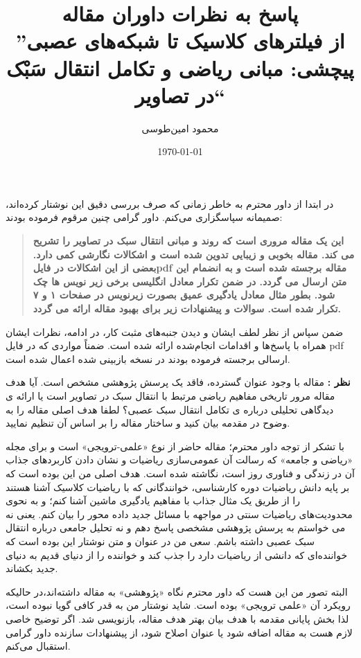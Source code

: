 \documentclass[a4paper,12pt]{article}
\newcounter{commentcounter}
\newcommand{\reviewercomment}[1]{%
    \stepcounter{commentcounter}%
    \begin{reviewerscomment}
        \textbf{نظر \arabic{commentcounter}:} #1
    \end{reviewerscomment}
}
\begin{document}
\title{پاسخ به نظرات داوران مقاله\\
    \large
    ''از فیلترهای کلاسیک تا شبکه‌های عصبی پیچشی: مبانی ریاضی و تکامل انتقال سَبْک در تصاویر``}
\author{محمود امین‌طوسی}
\date{\today}
\maketitle

در ابتدا از داور محترم به خاطر زمانی که صرف بررسی دقیق این نوشتار کرده‌اند، صمیمانه سپاسگزاری می‌کنم. 
 داور گرامی چنین مرقوم فرموده بودند:
\begin{quotation}\bf
این یک مقاله مروری است که روند و مبانی انتقال سبک در تصاویر را تشریح می کند. مقاله بخوبی و زیبایی تدوین شده است و اشکالات نگارشی کمی دارد. بعضی از این اشکالات در فایلpdf  مقاله برجسته شده است و به انضمام این متن ارسال می گردد. در ضمن تکرار معادل انگلیسی برخی زیر نویس ها چک شود. بطور مثال معادل یادگیری عمیق بصورت زیرنویس در صفحات ۱ و ۷ تکرار شده است.
سوالات و پیشنهادات زیر برای بهبود مقاله ارائه می گردد.
\end{quotation}


ضمن سپاس از نظر لطف ایشان و دیدن جنبه‌های مثبت کار،  در ادامه، نظرات ایشان همراه با پاسخ‌ها و اقدامات انجام‌شده ارائه شده است. ضمناً مواردی که در فایل pdf‌ ارسالی برجسته فرموده بودند در نسخه بازبینی شده اعمال شده است.




\reviewercomment{
مقاله با وجود عنوان گسترده، فاقد یک پرسش پژوهشی مشخص است. آیا هدف مقاله مرور تاریخی مفاهیم ریاضی مرتبط با انتقال سبک در تصاویر است یا ارائه ی دیدگاهی تحلیلی درباره ی تکامل انتقال سبک عصبی؟ لطفا هدف اصلی مقاله را به وضوح در مقدمه بیان کنید و ساختار مقاله را بر اساس آن تنظیم نمایید.}

\begin{myresponse}
با تشکر از توجه داور محترم؛ مقاله حاضر از نوع «علمی-ترویجی» است و برای مجله «ریاضی و جامعه» که رسالت آن عمومی‌سازی ریاضیات و نشان دادن کاربردهای جذاب آن در زندگی و فناوری روز است، نگاشته شده است. هدف اصلی من این بوده است که بر پایه دانش ریاضیات دوره کارشناسی، خوانندگانی که با ریاضیات کلاسیک آشنا هستند را از طریق یک مثال جذاب با مفاهیم یادگیری ماشین آشنا کنم؛‌ و به نحوی محدودیت‌های ریاضیات سنتی در مواجهه با مسائل جدید داده محور را بیان کنم.
یعنی نه می خواستم به پرسش پژوهشی مشخصی پاسخ دهم و نه تحلیل جامعی درباره انتقال سبک عصبی داشته باشم. سعی من در عنوان و متن نوشتار این بوده است که خواننده‌ای که دانشی از ریاضیات دارد را جذب کند و خواننده را از دنیای قدیم به دنیای جدید بکشاند.

البته تصور من این هست که داور محترم نگاه «پژوهشی» به مقاله داشته‌اند،‌در حالیکه رویکرد آن «علمی ترویجی» بوده است.
شاید نوشتار من به قدر کافی گویا نبوده است، لذا بخش پایانی مقدمه با هدف بیان بهتر هدف مقاله، بازنویسی شد.
اگر توضیح خاصی لازم هست به مقاله اضافه شود یا عنوان اصلاح شود، از پیشنهادات سازنده داور گرامی استقبال می‌کنم.
\end{myresponse}
\end{document}
